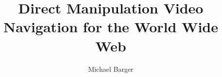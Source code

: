 \documentclass{report}
\begin{document}
\title{Direct Manipulation Video Navigation for the World Wide Web}
\author{Michael Barger}
\maketitle

\tableofcontents








\end{document}
